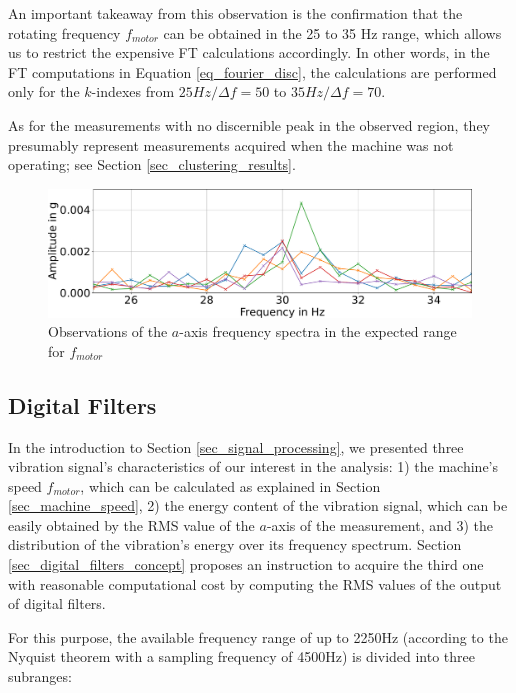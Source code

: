 \documentclass[conference]{IEEEtran}
\begin{document}
An important takeaway from this observation is the confirmation that the rotating frequency $f_{motor}$ can be obtained in the 25 to 35 Hz range, which allows us to restrict the expensive FT calculations accordingly. In other words, in the FT computations in Equation \ref{eq_fourier_disc}, the calculations are performed only for the $k$-indexes from $25Hz/\Delta f = 50$ to $35Hz/\Delta f = 70$.

As for the measurements with no discernible peak in the observed region, they presumably represent measurements acquired when the machine was not operating; see Section \ref{sec_clustering_results}.

\begin{figure}[htbp]
\centerline{\includegraphics[width=\columnwidth]{graphics/motor_frequency/motor_frequency.pdf}}
\caption{Observations of the $a$-axis frequency spectra in the expected range for $f_{motor}$}
\label{fig_motor_frequency}
\end{figure}



\subsection{Digital Filters}

In the introduction to Section \ref{sec_signal_processing}, we presented three vibration signal's characteristics of our interest in the analysis: 1) the machine's speed $f_{motor}$, which can be calculated as explained in Section \ref{sec_machine_speed}, 2) the energy content of the vibration signal, which can be easily obtained by the RMS value of the $a$-axis of the measurement, and 3) the distribution of the vibration's energy over its frequency spectrum. Section \ref{sec_digital_filters_concept} proposes an instruction to acquire the third one with reasonable computational cost by computing the RMS values of the output of digital filters.

For this purpose, the available frequency range of up to 2250Hz (according to the Nyquist theorem with a sampling frequency of 4500Hz) is divided into three subranges:
\end{document}
